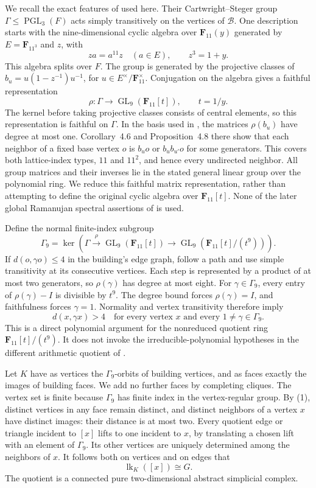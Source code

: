 \documentclass[10pt]{article}
\newcommand{\F}{\mathbf F}
\newcommand{\lk}{\operatorname{lk}}
\newcommand{\GL}{\operatorname{GL}}
\newcommand{\PGL}{\operatorname{PGL}}
\begin{document}
We recall the exact features of \cite[Sections~3--4]{LSV} used here. Their
Cartwright--Steger group $\Gamma\leq\PGL_3(F)$ acts simply transitively on the
vertices of $\mathcal B$. One description starts with the nine-dimensional
cyclic algebra over $\F_{11}(y)$ generated by $E=\F_{11^3}$ and $z$, with
\[
 za=a^{11}z\quad(a\in E),\qquad z^3=1+y.
\]
This algebra splits over $F$. The group is generated by the projective classes
of $b_u=u(1-z^{-1})u^{-1}$, for $u\in E^\times/\F_{11}^{\times}$.
Conjugation on the algebra gives a faithful representation
\[
 \rho:\Gamma\longrightarrow\GL_9(\F_{11}[t]),\qquad t=1/y.
\]
The kernel before taking projective classes consists of central elements,
so this representation is faithful on $\Gamma$. In the basis used in
\cite[Equation~(9) and Definition~4.7]{LSV}, the matrices $\rho(b_u)$ have degree
at most one. Corollary~4.6 and Proposition~4.8 there show that each neighbor
of a fixed base vertex $o$ is $b_u o$ or $b_u b_{u'}o$ for some generators.
This covers both lattice-index types, $11$ and $11^2$, and hence every
undirected neighbor. All group matrices and their inverses lie in the stated
general linear group over the polynomial ring. We reduce this faithful matrix
representation, rather than attempting to define the original cyclic algebra
over $\F_{11}[t]$. None of the later global Ramanujan spectral assertions of
\cite{LSV} is used.

Define the normal finite-index subgroup
\[
 \Gamma_9=\ker\!\left(\Gamma\xrightarrow{\rho}
 \GL_9(\F_{11}[t])\longrightarrow
 \GL_9(\F_{11}[t]/(t^9))\right).
\]
If $d(o,\gamma o)\leq4$ in the building's edge graph, follow a path and use simple
transitivity at its consecutive vertices. Each step is represented by a product
of at most two generators, so $\rho(\gamma)$ has degree at most eight.
For $\gamma\in\Gamma_9$, every entry of $\rho(\gamma)-I$ is divisible by $t^9$.
The degree bound forces $\rho(\gamma)=I$, and faithfulness forces $\gamma=1$.
Normality and vertex transitivity therefore imply
\[
 d(x,\gamma x)>4
 \quad\text{for every vertex }x
 \text{ and every }1\ne\gamma\in\Gamma_9.                 \tag{1}
\]
This is a direct polynomial argument for the nonreduced quotient ring
$\F_{11}[t]/(t^9)$. It does not invoke the irreducible-polynomial hypotheses
in the different arithmetic quotient of \cite[Proposition~3.3]{LM}.

Let $K$ have as vertices the $\Gamma_9$-orbits of building vertices, and as faces
exactly the images of building faces. We add no further faces by completing
cliques. The vertex set is finite because $\Gamma_9$ has finite index in the
vertex-regular group. By (1), distinct vertices in any face remain distinct,
and distinct neighbors of a vertex $x$ have distinct images: their distance
is at most two. Every quotient edge or triangle incident to $[x]$ lifts to
one incident to $x$, by translating a chosen lift with an element of $\Gamma_9$.
Its other vertices are uniquely determined among the neighbors of $x$.
It follows both on vertices and on edges that
\[
                   \lk_K([x])\cong G.                 \tag{2}
\]
The quotient is a connected pure two-dimensional abstract simplicial complex.
\end{document}
